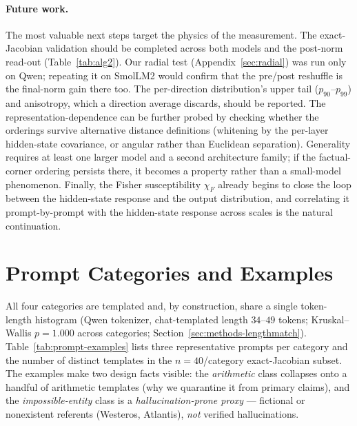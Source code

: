 \documentclass{article}
\begin{document}
\paragraph{Future work.}
The most valuable next steps target the physics of the measurement. The exact-Jacobian validation
should be completed across both models and the post-norm read-out (Table~\ref{tab:alg2}). Our
radial test (Appendix~\ref{sec:radial}) was run only on Qwen; repeating it on SmolLM2 would confirm
that the pre/post reshuffle is the final-norm gain there too. The per-direction distribution's upper tail
($p_{90}$--$p_{99}$) and anisotropy, which a direction average discards, should be reported. The
representation-dependence can be further probed by checking whether the orderings survive
alternative distance definitions (whitening by the per-layer hidden-state covariance, or angular
rather than Euclidean separation). Generality requires at least one larger model and a second
architecture family; if the factual-corner ordering persists there, it becomes a property rather than
a small-model phenomenon. Finally, the Fisher susceptibility $\chi_F$ already begins to close the
loop between the hidden-state response and the output distribution, and correlating it
prompt-by-prompt with the hidden-state response across scales is the natural continuation.

\appendix
\section{Prompt Categories and Examples}
\label{sec:prompt-examples}
All four categories are templated and, by construction, share a single token-length histogram (Qwen
tokenizer, chat-templated length $34$--$49$ tokens; Kruskal--Wallis $p=1.000$ across categories;
Section~\ref{sec:methods-lengthmatch}). Table~\ref{tab:prompt-examples} lists three representative
prompts per category and the number of distinct templates in the $n{=}40$/category exact-Jacobian
subset. The examples make two design facts visible: the \emph{arithmetic} class collapses onto a handful
of arithmetic templates (why we quarantine it from primary claims), and the
\emph{impossible-entity} class is a \emph{hallucination-prone proxy} --- fictional or nonexistent
referents (Westeros, Atlantis), \emph{not} verified hallucinations.
\end{document}
